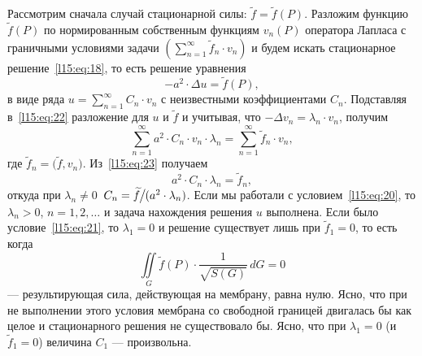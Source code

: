 Рассмотрим сначала случай стационарной силы: $\widetilde{f}=\widetilde{f}(P)$. Разложим функцию $\widetilde{f}(P)$ по нормированным собственным функциям $v_n(P)$ оператора Лапласа с граничными условиями задачи $\left(\sum\limits_{n=1}^{\infty}\widetilde{f}_n\cdot v_n\right)$ и будем искать стационарное решение~\eqref{l15:eq:18}, то есть решение уравнения
\begin{equation}\label{l15:eq:22}
	-a^2\cdot\Delta u=\widetilde{f}(P),
\end{equation}
в виде ряда $\displaystyle u=\sum\limits_{n=1}^{\infty}C_n\cdot v_n$ с неизвестными коэффициентами $C_n$. Подставляя в~\eqref{l15:eq:22} разложение для $u$ и $\widetilde{f}$ и учитывая, что $-\Delta v_n=\lambda_n\cdot v_n$, получим
\begin{equation}\label{l15:eq:23}
	\sum\limits_{n=1}^{\infty}a^2\cdot C_n\cdot v_n\cdot\lambda_n=\sum\limits_{n=1}^{\infty}\widetilde{f}_n\cdot v_n,
\end{equation}
где $\widetilde{f}_n=\big(\widetilde{f},v_n\big)$. Из~\eqref{l15:eq:23} получаем
\begin{equation*}
	 a^2\cdot C_n\cdot\lambda_n=\widetilde{f}_n,
\end{equation*}
откуда при $\lambda_n\neq0$\ $C_n=\widetilde{f}\!\!\bigm/\!\!(a^2\cdot\lambda_n)$. Если мы работали с условием~\eqref{l15:eq:20}, то $\lambda_n>0$, $n=1,2,\ldots$ и задача нахождения решения $u$ выполнена. Если было условие~\eqref{l15:eq:21}, то $\lambda_1=0$ и решение существует лишь при $\widetilde{f}_1=0$, то есть когда 
\begin{equation*}
	\iint\limits_{G} \widetilde{f}(P)\cdot\frac{1}{\sqrt{S(G)}}\,dG=0
\end{equation*}
--- результирующая сила, действующая на мембрану, равна нулю. Ясно, что при не выполнении этого условия мембрана со свободной границей двигалась бы как целое и стационарного решения не существовало бы. Ясно, что при $\lambda_1=0$ (и $\widetilde{f}_1=0$) величина $C_1$ --- произвольна.  

